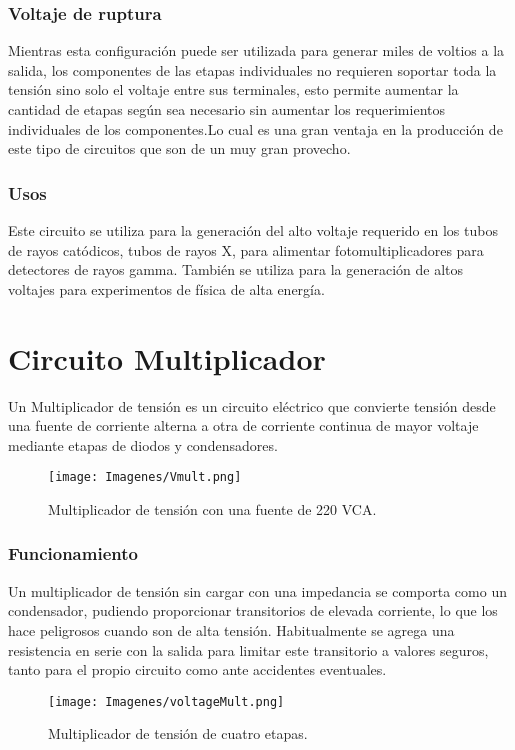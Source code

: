 \subsubsection{Voltaje de ruptura}

Mientras esta configuración puede ser utilizada para generar miles de voltios a la salida, los componentes de las etapas individuales no requieren soportar toda la tensión sino solo el voltaje entre sus terminales, esto permite aumentar la cantidad de etapas según sea necesario sin aumentar los requerimientos individuales de los componentes.Lo cual es una gran ventaja en la producción de este tipo de circuitos que son de un muy gran provecho.\citep{multTensWiki}\\

\subsubsection{Usos}

Este circuito se utiliza para la generación del alto voltaje requerido en los tubos de rayos catódicos, tubos de rayos X, para alimentar fotomultiplicadores para detectores de rayos gamma. También se utiliza para la generación de altos voltajes para experimentos de física de alta energía.\citep{multTensWiki}\\


\section{Circuito Multiplicador}


Un Multiplicador de tensión es un circuito eléctrico que convierte tensión desde una fuente de corriente alterna a otra de corriente continua de mayor voltaje mediante etapas de diodos y condensadores.\citep{multTensWiki}\\

\begin{figure}[ht!]
    \centering
    \texttt{[image: Imagenes/Vmult.png]}
    \caption{Multiplicador de tensión con una fuente de 220 VCA.}
    \label{fig:vmult}
\end{figure}

\subsubsection{Funcionamiento}

Un multiplicador de tensión sin cargar con una impedancia se comporta como un condensador, pudiendo proporcionar transitorios de elevada corriente, lo que los hace peligrosos cuando son de alta tensión. Habitualmente se agrega una resistencia en serie con la salida para limitar este transitorio a valores seguros, tanto para el propio circuito como ante accidentes eventuales.\citep{multTensWiki}\\

\begin{figure}[ht!]
    \centering
    \texttt{[image: Imagenes/voltageMult.png]}
    \caption{Multiplicador de tensión de cuatro etapas.}
    \label{fig:vmult2}
\end{figure}
